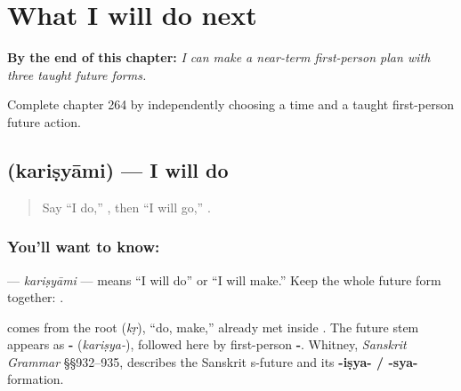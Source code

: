 
\chapter{What I will do next}
\label{ch:sa-near-term-first-person-plans}

\begin{chapteropening}
\textbf{By the end of this chapter:} \emph{I can make a near-term first-person plan with three taught future forms.}

Complete chapter 264 by independently choosing a time and a taught first-person future action.
\end{chapteropening}

\section[\texorpdfstring{\sk{करिष्यामि} (kariṣyāmi)}{करिष्यामि (kariṣyāmi)}]{ (kariṣyāmi) — I will do}

\label{lesson:SA-C264-karisyami}



\begin{quote}
Say “I do,” \textbf{}, then “I will go,” \textbf{}.
\end{quote}

\subsection*{You'll want to know: }
\textbf{} — \emph{kariṣyāmi} — means “I will do” or “I will make.” Keep the whole future form together: \textbf{}.

\begin{cousinweb}
\textbf{} comes from the root \textbf{} (\emph{kṛ}), “do, make,” already met inside \textbf{}. The future stem appears as \textbf{-} (\emph{kariṣya-}), followed here by first-person \textbf{-}. Whitney, \emph{Sanskrit Grammar} §§932–935, describes the Sanskrit s-future and its \textbf{-iṣya- / -sya-} formation.
\end{cousinweb}

